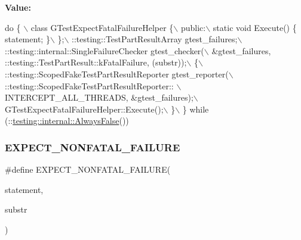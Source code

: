 {\bfseries Value\+:}
\begin{DoxyCode}
\textcolor{keywordflow}{do} \{ \(\backslash\)
    class GTestExpectFatalFailureHelper \{\(\backslash\)
     public:\(\backslash\)
      static \textcolor{keywordtype}{void} Execute() \{ statement; \}\(\backslash\)
    \};\(\backslash\)
    ::testing::TestPartResultArray gtest\_failures;\(\backslash\)
    ::testing::internal::SingleFailureChecker gtest\_checker(\(\backslash\)
        &gtest\_failures, ::testing::TestPartResult::kFatalFailure, (substr));\(\backslash\)
    \{\(\backslash\)
      ::testing::ScopedFakeTestPartResultReporter gtest\_reporter(\(\backslash\)
          ::testing::ScopedFakeTestPartResultReporter:: \(\backslash\)
          INTERCEPT\_ALL\_THREADS, &gtest\_failures);\(\backslash\)
      GTestExpectFatalFailureHelper::Execute();\(\backslash\)
    \}\(\backslash\)
  \} \textcolor{keywordflow}{while} (::\hyperlink{namespacetesting_1_1internal_a4b24c851ab13569b1b15b3d259b60d2e}{testing::internal::AlwaysFalse}())
\end{DoxyCode}
\mbox{\label{gtest-spi_8h_a8376fd6821bd88fd806697355e79e138}} 
\subsubsection{\texorpdfstring{E\+X\+P\+E\+C\+T\+\_\+\+N\+O\+N\+F\+A\+T\+A\+L\+\_\+\+F\+A\+I\+L\+U\+RE}{EXPECT\_NONFATAL\_FAILURE}}
{\footnotesize\ttfamily \#define E\+X\+P\+E\+C\+T\+\_\+\+N\+O\+N\+F\+A\+T\+A\+L\+\_\+\+F\+A\+I\+L\+U\+RE(\begin{DoxyParamCaption}\item[{}]{statement,  }\item[{}]{substr }\end{DoxyParamCaption})}

